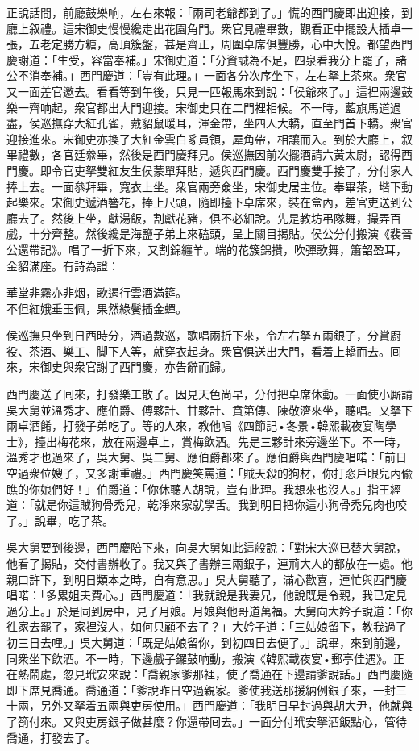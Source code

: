 正說話間，前廳鼓樂响，左右來報：「兩司老爺都到了。」慌的西門慶即出迎接，到廳上叙禮。這宋御史慢慢纔走出花園角門。衆官見禮畢數，觀看正中擺設大插卓一張，五老定勝方糖，高頂簇盤，甚是齊正，周圍卓席俱豐勝，心中大悅。都望西門慶謝道：「生受，容當奉補。」宋御史道：「分資誠為不足，四泉看我分上罷了，諸公不消奉補。」西門慶道：「豈有此理。」一面各分次序坐下，左右拏上茶來。衆官又一面差官邀去。看看等到午後，只見一匹報馬來到說：「侯爺來了。」這裡兩邊鼓樂一齊响起，衆官都出大門迎接。宋御史只在二門裡相候。不一時，藍旗馬道過盡，侯巡撫穿大紅孔雀，戴貂鼠暖耳，渾金帶，坐四人大轎，直至門首下轎。衆官迎接進來。宋御史亦換了大紅金雲白豸員領，犀角帶，相讓而入。到於大廳上，叙畢禮數，各官廷叅畢，然後是西門慶拜見。侯巡撫因前次擺酒請六黃太尉，認得西門慶。即令官吏拏雙紅友生侯蒙單拜貼，遞與西門慶。西門慶雙手接了，分付家人捧上去。一面叅拜畢，寬衣上坐。衆官兩旁僉坐，宋御史居主位。奉畢茶，堦下動起樂來。宋御史遞酒簪花，捧上尺頭，隨即擡下卓席來，裝在盒內，差官吏送到公廳去了。然後上坐，獻湯飯，割獻花豬，俱不必細說。先是教坊弔隊舞，撮弄百戲，十分齊整。然後纔是海鹽子弟上來磕頭，呈上關目揭貼。侯公分付搬演《裴晉公還帶記》。唱了一折下來，又割錦纏羊。端的花簇錦攢，吹彈歌舞，簫韶盈耳，金貂滿座。{}有詩為證：

\begin{myquote} 
華堂非霧亦非烟，歌遏行雲酒滿筵。\\不但紅娥垂玉佩，果然綠鬢插金蟬。
\end{myquote} 

侯巡撫只坐到日西時分，酒過數巡，歌唱兩折下來，令左右拏五兩銀子，分賞廚役、茶酒、樂工、脚下人等，就穿衣起身。衆官俱送出大門，看着上轎而去。囘來，宋御史與衆官謝了西門慶，亦告辭而歸。

西門慶送了囘來，打發樂工散了。因見天色尚早，分付把卓席休動。一面使小厮請吳大舅並溫秀才、應伯爵、傅夥計、甘夥計、賁第傳、陳敬濟來坐，聽唱。又拏下兩卓酒餚，打發子弟吃了。等的人來，教他唱《四節記•冬景•韓熙載夜宴陶學士》，擡出梅花來，放在兩邊卓上，賞梅飲酒。先是三夥計來旁邊坐下。不一時，溫秀才也過來了，吳大舅、吳二舅、應伯爵都來了。應伯爵與西門慶唱喏：「前日空過衆位嫂子，又多謝重禮。」西門慶笑罵道：「賊天殺的狗材，你打窓戶眼兒內偸瞧的你娘們好！」{}伯爵道：「你休聽人胡說，豈有此理。我想來也沒人。」{}指王經道：「就是你這賊狗骨禿兒，乾淨來家就學舌。我到明日把你這小狗骨禿兒肉也咬了。」說畢，吃了茶。

吳大舅要到後邊，西門慶陪下來，向吳大舅如此這般說：「對宋大巡已替大舅說，他看了揭貼，交付書辦收了。我又與了書辦三兩銀子，連荊大人的都放在一處。他親口許下，到明日類本之時，自有意思。」吳大舅聽了，滿心歡喜，連忙與西門慶唱喏：「多累姐夫費心。」西門慶道：「我就說是我妻兄，他說既是令親，我已定見過分上。」於是同到房中，見了月娘。月娘與他哥道萬福。大舅向大妗子說道：「你徃家去罷了，家裡沒人，如何只顧不去了？」大妗子道：「三姑娘留下，教我過了初三日去哩。」吳大舅道：「既是姑娘留你，到初四日去便了。」說畢，來到前邊，同衆坐下飲酒。不一時，下邊戲子鑼鼓响動，搬演《韓熙載夜宴•郵亭佳遇》。正在熱鬧處，忽見玳安來說：「喬親家爹那裡，使了喬通在下邊請爹說話。」西門慶隨即下席見喬通。喬通道：「爹說昨日空過親家。爹使我送那援納例銀子來，一封三十兩，另外又拏着五兩與吏房使用。」西門慶道：「我明日早封過與胡大尹，他就與了箚付來。又與吏房銀子做甚麼？你還帶囘去。」一面分付玳安拏酒飯點心，管待喬通，打發去了。

